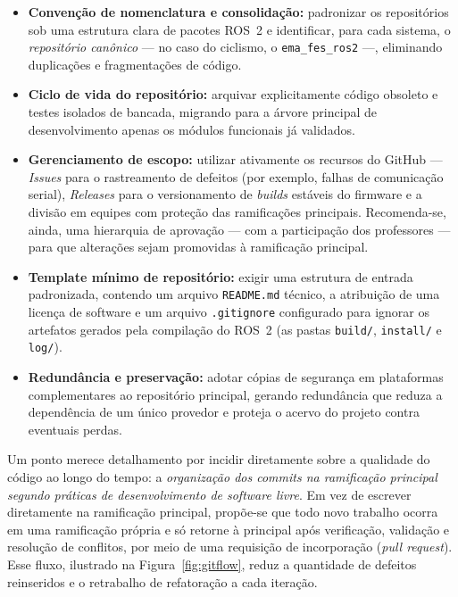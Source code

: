 \begin{itemize}
	\item \textbf{Convenção de nomenclatura e consolidação:} padronizar os repositórios sob
	      uma estrutura clara de pacotes ROS~2 e identificar, para cada sistema, o
	      \emph{repositório canônico} --- no caso do ciclismo, o \texttt{ema\_fes\_ros2} ---,
	      eliminando duplicações e fragmentações de código.
	\item \textbf{Ciclo de vida do repositório:} arquivar explicitamente código obsoleto e
	      testes isolados de bancada, migrando para a árvore principal de desenvolvimento
	      apenas os módulos funcionais já validados.
	\item \textbf{Gerenciamento de escopo:} utilizar ativamente os recursos do GitHub ---
	      \emph{Issues} para o rastreamento de defeitos (por exemplo, falhas de comunicação
	      serial), \emph{Releases} para o versionamento de \emph{builds} estáveis do firmware
	      e a divisão em equipes com proteção das ramificações principais. Recomenda-se, ainda,
	      uma hierarquia de aprovação --- com a participação dos professores --- para que
	      alterações sejam promovidas à ramificação principal.
	\item \textbf{Template mínimo de repositório:} exigir uma estrutura de entrada
	      padronizada, contendo um arquivo \texttt{README.md} técnico, a atribuição de uma
	      licença de software e um arquivo \texttt{.gitignore} configurado para ignorar os
	      artefatos gerados pela compilação do ROS~2 (as pastas \texttt{build/},
	      \texttt{install/} e \texttt{log/}).
	\item \textbf{Redundância e preservação:} adotar cópias de segurança em plataformas
	      complementares ao repositório principal, gerando redundância que reduza a dependência
	      de um único provedor e proteja o acervo do projeto contra eventuais perdas.
\end{itemize}

Um ponto merece detalhamento por incidir diretamente sobre a qualidade do código ao longo do
tempo: a \emph{organização dos commits na ramificação principal segundo práticas de
desenvolvimento de software livre}. Em vez de escrever diretamente na ramificação principal,
propõe-se que todo novo trabalho ocorra em uma ramificação própria e só retorne à principal
após verificação, validação e resolução de conflitos, por meio de uma requisição de
incorporação (\emph{pull request}). Esse fluxo, ilustrado na Figura~\ref{fig:gitflow}, reduz
a quantidade de defeitos reinseridos e o retrabalho de refatoração a cada iteração.

